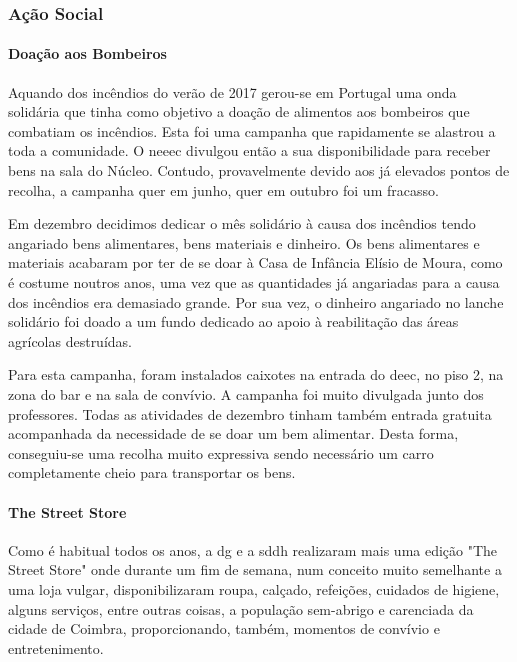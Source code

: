
\subsubsection{Ação Social}

\paragraph{Doação aos Bombeiros}

Aquando dos incêndios do verão de 2017 gerou-se em Portugal uma onda solidária que tinha como objetivo a doação de alimentos aos bombeiros que combatiam os incêndios. Esta foi uma campanha que rapidamente se alastrou a toda a comunidade. O \acrshort{neeec} divulgou então a sua disponibilidade para receber bens na sala do Núcleo. Contudo, provavelmente devido aos já elevados pontos de recolha, a campanha quer em junho, quer em outubro foi um fracasso.

Em dezembro decidimos dedicar o mês solidário à causa dos incêndios tendo angariado bens alimentares, bens materiais e dinheiro. Os bens alimentares e materiais acabaram por ter de se doar à Casa de Infância Elísio de Moura, como é costume noutros anos, uma vez que as quantidades já angariadas para a causa dos incêndios era demasiado grande. Por sua vez, o dinheiro angariado no lanche solidário foi doado a um fundo dedicado ao apoio à reabilitação das áreas agrícolas destruídas.

Para esta campanha, foram instalados caixotes na entrada do \acrshort{deec}, no piso 2, na zona do bar e na sala de convívio. A campanha foi muito divulgada junto dos professores. Todas as atividades de dezembro tinham também entrada gratuita acompanhada da necessidade de se doar um bem alimentar. Desta forma, conseguiu-se uma recolha muito expressiva sendo necessário um carro completamente cheio para transportar os bens.


\paragraph{The Street Store}

Como é habitual todos os anos, a \acrfull{dg} e a \acrfull{sddh} realizaram mais uma edição "The Street Store" onde durante um fim de semana, num conceito muito semelhante a uma loja vulgar, disponibilizaram roupa, calçado, refeições, cuidados de higiene, alguns serviços, entre outras coisas, a população sem-abrigo e carenciada da cidade de Coimbra, proporcionando, também, momentos de convívio e entretenimento.

